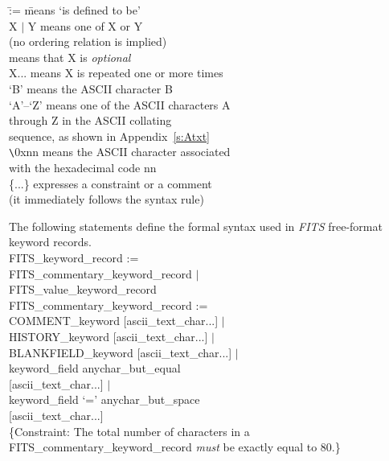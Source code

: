 \documentclass[onecolumn]{aa}
\begin{document}
\begin{tabbing}
\null \hspace{0.35in} \= := \hspace{0.5in} \= means `is defined to be' \\
\>X $|$ Y \> means one of X or Y \\
\>    	\> (no ordering relation is implied) \\
\>[X]	\> means that X is {\em optional} \\
\>X...	\> means X is repeated one or more times \\
\>`B'	\> means the ASCII character B \\
\>`A'--`Z' \> means one of the ASCII characters A \\
\> 	\> through Z in the ASCII collating\\
\>      \> sequence, as shown in Appendix~\ref{s:Atxt} \\
\>\verb+\+0xnn \> means the ASCII character associated \\
\> 	\> with the hexadecimal code nn \\
\>\{...\}	\> expresses a constraint or a comment \\
\> 	\> (it immediately follows the syntax rule) \\
\end{tabbing}

The following statements define the formal syntax used in 
{\em FITS\/} free-format keyword records.\\

FITS\_keyword\_record := \\ \null \hspace{0.5in}
	FITS\_commentary\_keyword\_record $|$ \\ \null \hspace{0.5in}
	FITS\_value\_keyword\_record \\

FITS\_commentary\_keyword\_record := \\ \null \hspace{0.5in}
	COMMENT\_keyword [ascii\_text\_char...]    $|$ \\ \null \hspace{0.5in}
	HISTORY\_keyword [ascii\_text\_char...]    $|$ \\ \null \hspace{0.5in}
	BLANKFIELD\_keyword [ascii\_text\_char...] $|$ \\ \null \hspace{0.5in}
	keyword\_field anychar\_but\_equal \\ \null \hspace{1.0in}
		[ascii\_text\_char...] $|$ \\ \null \hspace{0.5in}
	keyword\_field `=' anychar\_but\_space \\ \null \hspace{1.0in}
		[ascii\_text\_char...] \\
\{Constraint: The total number of characters in a
FITS\_commentary\_keyword\_record {\em must} be exactly equal to 80.\} \\
\end{document}
